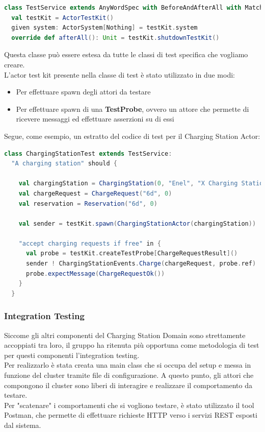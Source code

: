 \begin {lstlisting}[language=scala]
class TestService extends AnyWordSpec with BeforeAndAfterAll with Matchers:
  val testKit = ActorTestKit()
  given system: ActorSystem[Nothing] = testKit.system
  override def afterAll(): Unit = testKit.shutdownTestKit()
\end{lstlisting}

Questa classe può essere estesa da tutte le classi di test specifica che vogliamo creare.\\

L'actor test kit presente nella classe di test è stato utilizzato in due modi:

\begin{itemize}
    \item Per effettuare spawn degli attori da testare
    \item Per effettuare spawn di una \textbf{TestProbe}, ovvero un attore che permette di ricevere messaggi ed effettuare asserzioni su di essi
\end{itemize}

Segue, come esempio, un estratto del codice di test per il Charging Station Actor:

\begin {lstlisting}[language=scala]
class ChargingStationTest extends TestService:
  "A charging station" should {

    val chargingStation = ChargingStation(0, "Enel", "X Charging Station", 100, Position(44.17457186518429, 12.23658150624628))
    val chargeRequest = ChargeRequest("6d", 0)
    val reservation = Reservation("6d", 0)

    val sender = testKit.spawn(ChargingStationActor(chargingStation))

    "accept charging requests if free" in {
      val probe = testKit.createTestProbe[ChargeRequestResult]()
      sender ! ChargingStationEvents.Charge(chargeRequest, probe.ref)
      probe.expectMessage(ChargeRequestOk())
    }
  }

\end{lstlisting}


\subsubsection{Integration Testing}
Siccome gli altri componenti del Charging Station Domain sono strettamente accoppiati tra loro, il gruppo ha ritenuta più opportuna come metodologia di test per questi componenti l'integration testing.\\
Per realizzarlo è stata creata una main class che si occupa del setup e messa in funzione del cluster tramite file di configurazione. A questo punto, gli attori che compongono il cluster sono liberi di interagire e realizzare il comportamento da testare.\\
Per "scatenare" i comportamenti che si vogliono testare, è stato utilizzato il tool Postman, che permette di effettuare richieste HTTP verso i servizi REST esposti dal sistema.\\

